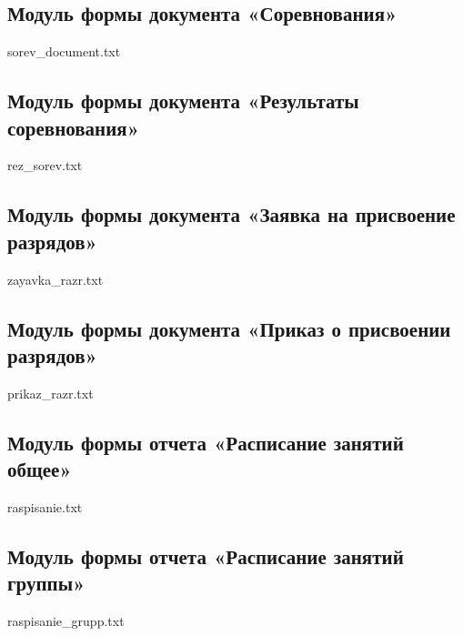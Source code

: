 
\subsection*{Модуль формы документа «Соревнования»}

{sorev_document.txt}

\subsection*{Модуль формы документа «Результаты соревнования»}

{rez_sorev.txt}

\subsection*{Модуль формы документа «Заявка на присвоение разрядов»}

{zayavka_razr.txt}

\subsection*{Модуль формы документа «Приказ о присвоении разрядов»}

{prikaz_razr.txt}

\subsection*{Модуль формы отчета «Расписание занятий общее»}

{raspisanie.txt}

\subsection*{Модуль формы отчета «Расписание занятий группы»}

{raspisanie_grupp.txt}

